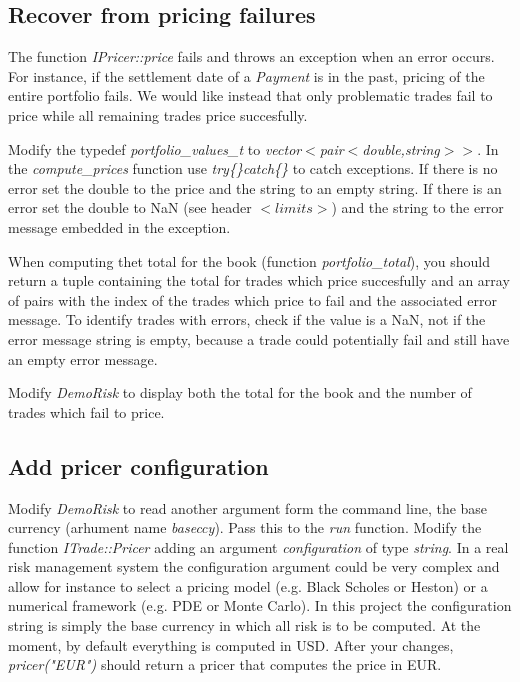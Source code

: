 \documentclass[10pt]{article}
\begin{document}
\subsection{Recover from pricing failures}
The function \textit{IPricer::price} fails and throws an exception when an error occurs. For instance, if the settlement date of a \textit{Payment} is in the past, pricing of the entire portfolio fails. We would like instead that only problematic trades fail to price while all remaining trades price succesfully.

Modify the typedef \textit{portfolio\_values\_t} to \textit{vector$<$pair$<$double,string$>>$}. In the \textit{compute\_prices} function use \textit{try\{\}catch\{\}} to catch exceptions. If there is no error set the double to the price and the string to an empty string. If there is an error set the double to NaN (see header $<limits>$) and the string to the error message embedded in the exception.

When computing thet total for the book (function \textit{portfolio\_total}), you should return a tuple containing the total for trades which price succesfully and an array of pairs with the index of the trades which price to fail and the associated error message. To identify trades with errors, check if the value is a NaN, not if the error message string is empty, because a trade could potentially fail and still have an empty error message.

Modify \textit{DemoRisk} to display both the total for the book and the number of trades which fail to price.


\subsection{Add pricer configuration}
Modify \textit{DemoRisk} to read another argument form the command line, the base currency (arhument name \textit{baseccy}). Pass this to the \textit{run} function.
Modify the function \textit{ITrade::Pricer} adding an argument \textit{configuration} of type \textit{string}. In a real risk management system the configuration argument could be very complex and allow for instance to select a pricing model (e.g. Black Scholes or Heston) or a numerical framework (e.g. PDE or Monte Carlo). In this project the configuration string is simply the base currency in which all risk is to be computed. At the moment, by default everything is computed in USD. After your changes, \textit{pricer("EUR")} should return a pricer that computes the price in EUR.\\
\end{document}
